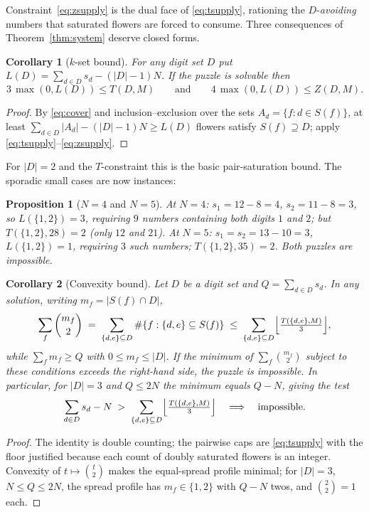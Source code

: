 \documentclass[11pt]{article}
\newtheorem{corollary}{Corollary}
\newtheorem{proposition}{Proposition}
\theoremstyle{definition}
\theoremstyle{remark}
\begin{document}
Constraint~\eqref{eq:zsupply} is the dual face of \eqref{eq:tsupply}, rationing the $D$-\emph{avoiding} numbers that saturated flowers are forced to consume. Three consequences of Theorem~\ref{thm:system} deserve closed forms.

\begin{corollary}[$k$-set bound]\label{cor:kset}
For any digit set $D$ put $L(D)=\sum_{d\in D}s_d-(|D|-1)N$. If the puzzle is solvable then
\[
3\,\max(0,L(D)) \le T(D,M)\qquad\text{and}\qquad 4\,\max(0,L(D)) \le Z(D,M).
\]
\end{corollary}

\begin{proof}
By \eqref{eq:cover} and inclusion--exclusion over the sets $A_d=\{f: d\in S(f)\}$, at least $\sum_{d\in D}|A_d|-(|D|-1)N \ge L(D)$ flowers satisfy $S(f)\supseteq D$; apply \eqref{eq:tsupply}--\eqref{eq:zsupply}.
\end{proof}

For $|D|=2$ and the $T$-constraint this is the basic pair-saturation bound. The sporadic small cases are now instances:

\begin{proposition}[$N=4$ and $N=5$]\label{prop:45}
At $N=4$: $s_1=12-8=4$, $s_2=11-8=3$, so $L(\{1,2\})=3$, requiring $9$ numbers containing both digits $1$ and $2$; but $T(\{1,2\},28)=2$ (only $12$ and $21$). At $N=5$: $s_1=s_2=13-10=3$, $L(\{1,2\})=1$, requiring $3$ such numbers; $T(\{1,2\},35)=2$. Both puzzles are impossible.
\end{proposition}

\begin{corollary}[Convexity bound]\label{cor:convex}
Let $D$ be a digit set and $Q=\sum_{d\in D}s_d$. In any solution, writing $m_f=|S(f)\cap D|$,
\[
\sum_f \binom{m_f}{2} \;=\; \sum_{\{d,e\}\subseteq D} \#\{f: \{d,e\}\subseteq S(f)\} \;\le\; \sum_{\{d,e\}\subseteq D} \Bigl\lfloor \tfrac{T(\{d,e\},M)}{3}\Bigr\rfloor,
\]
while $\sum_f m_f \ge Q$ with $0\le m_f\le |D|$. If the minimum of $\sum_f\binom{m_f}{2}$ subject to these conditions exceeds the right-hand side, the puzzle is impossible. In particular, for $|D|=3$ and $Q\le 2N$ the minimum equals $Q-N$, giving the test
\[
\sum_{d\in D}s_d - N \;>\; \sum_{\{d,e\}\subseteq D}\Bigl\lfloor \tfrac{T(\{d,e\},M)}{3}\Bigr\rfloor \quad\Longrightarrow\quad \text{impossible}.
\]
\end{corollary}

\begin{proof}
The identity is double counting; the pairwise caps are \eqref{eq:tsupply} with the floor justified because each count of doubly saturated flowers is an integer. Convexity of $t\mapsto\binom{t}{2}$ makes the equal-spread profile minimal; for $|D|=3$, $N\le Q\le 2N$, the spread profile has $m_f\in\{1,2\}$ with $Q-N$ twos, and $\binom{2}{2}=1$ each.
\end{proof}
\end{document}
